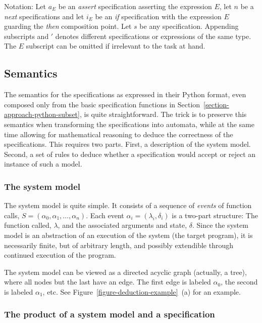 Notation: Let $a_E$ be an \textit{assert} specification asserting the
expression $E$, let $n$ be a \textit{next} specifications and let $i_E$ be an
\textit{if} specification with the expression $E$ guarding the \textit{then}
composition point. Let $s$ be any specification. Appending subscripts and $'$
denotes different specifications or expressions of the same type. The $E$
subscript can be omitted if irrelevant to the task at hand.


\subsection{Semantics} \label{section-approach-semantics}

The semantics for the specifications as expressed in their Python format, even
composed only from the basic specification functions in
Section~\ref{section-approach-python-subset}, is quite straightforward. The
trick is to preserve this semantics when transforming the specifications into
automata, while at the same time allowing for mathematical reasoning to deduce
the correctness of the specifications. This requires two parts. First, a
description of the system model. Second, a set of rules to deduce whether a
specification would accept or reject an instance of such a model.


\subsubsection{The system model}

The system model is quite simple. It consists of a sequence of \textit{events}
of function calls, $S = (\alpha_0, \alpha_1, \dots, \alpha_n)$. Each event
$\alpha_i = (\lambda_i, \delta_i)$ is a two-part structure: The function
called, $\lambda$, and the associated arguments and state, $\delta$. Since the
system model is an abstraction of an execution of the system (the target
program), it is necessarily finite, but of arbitrary length, and possibly
extendible through continued execution of the program.

The system model can be viewed as a directed acyclic graph (actually, a tree),
where all nodes but the last have an edge. The first edge is labeled
$\alpha_0$, the second is labeled $\alpha_1$, etc. See
Figure~\ref{figure-deduction-example}~(a) for an example.


\subsubsection{The product of a system model and a specification}

